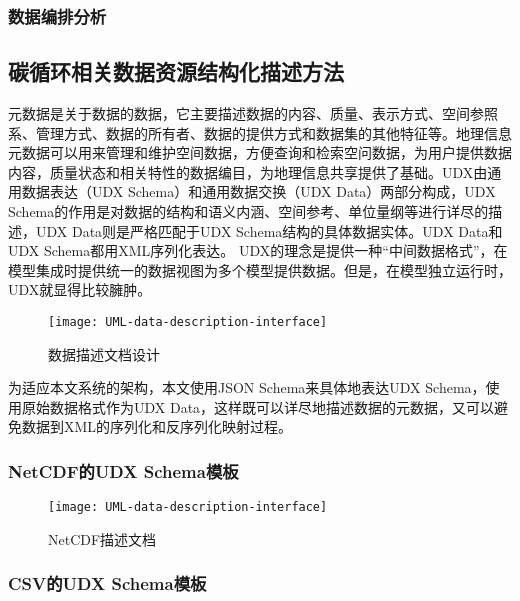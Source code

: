 \subsubsection{数据编排分析}

\subsection{碳循环相关数据资源结构化描述方法}
元数据是关于数据的数据，它主要描述数据的内容、质量、表示方式、空间参照系、管理方式、数据的所有者、数据的提供方式和数据集的其他特征等。地理信息元数据可以用来管理和维护空间数据，方便查询和检索空问数据，为用户提供数据内容，质量状态和相关特性的数据编目，为地理信息共享提供了基础。UDX由通用数据表达（UDX Schema）和通用数据交换（UDX Data）两部分构成，UDX Schema的作用是对数据的结构和语义内涵、空间参考、单位量纲等进行详尽的描述，UDX Data则是严格匹配于UDX Schema结构的具体数据实体。UDX Data和UDX Schema都用XML序列化表达。
UDX的理念是提供一种“中间数据格式”，在模型集成时提供统一的数据视图为多个模型提供数据。但是，在模型独立运行时，UDX就显得比较臃肿。

\begin{figure}[!htbp]
    \centering
    \texttt{[image: UML-data-description-interface]}
    \caption{数据描述文档设计}
    \label{fig:UML-data-description-interface}
\end{figure}

为适应本文系统的架构，本文使用JSON Schema来具体地表达UDX Schema，使用原始数据格式作为UDX Data，这样既可以详尽地描述数据的元数据，又可以避免数据到XML的序列化和反序列化映射过程。

\subsubsection{NetCDF的UDX Schema模板}

\begin{figure}[!htbp]
    \centering
    \texttt{[image: UML-data-description-interface]}
    \caption{NetCDF描述文档}
    \label{fig:UML-data-description-interface}
\end{figure}

\subsubsection{CSV的UDX Schema模板}

